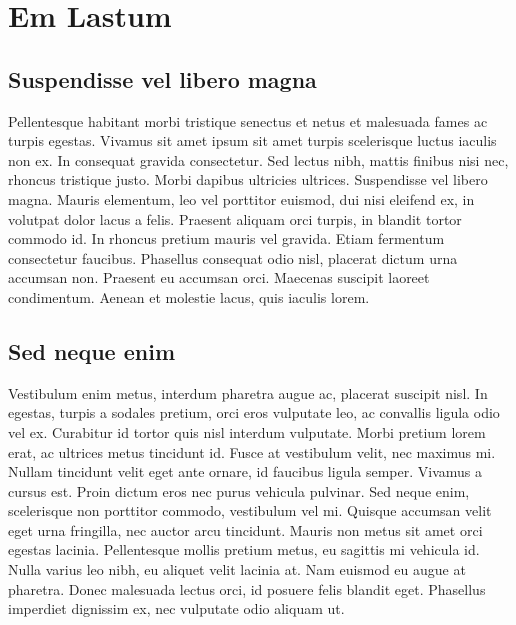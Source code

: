 \chapter{Em Lastum}

\section{Suspendisse vel libero magna}
Pellentesque habitant morbi tristique senectus et netus et malesuada fames ac turpis egestas.
 Vivamus sit amet ipsum sit amet turpis scelerisque luctus iaculis non ex. In consequat 
 gravida consectetur. Sed lectus nibh, mattis finibus nisi nec, rhoncus tristique justo. 
 Morbi dapibus ultricies ultrices. Suspendisse vel libero magna. Mauris elementum, leo 
 vel porttitor euismod, dui nisi eleifend ex, in volutpat dolor lacus a felis. Praesent
 aliquam orci turpis, in blandit tortor commodo id. In rhoncus pretium mauris vel gravida. 
 Etiam fermentum consectetur faucibus. Phasellus consequat odio nisl, placerat dictum urna 
 accumsan non. Praesent eu accumsan orci. Maecenas suscipit laoreet condimentum. Aenean et 
 molestie lacus, quis iaculis lorem.
 
 \section{Sed neque enim}
 Vestibulum enim metus, interdum pharetra augue ac, placerat suscipit nisl. In egestas, 
 turpis a sodales pretium, orci eros vulputate leo, ac convallis ligula odio vel ex. 
 Curabitur id tortor quis nisl interdum vulputate. Morbi pretium lorem erat, ac ultrices
 metus tincidunt id. Fusce at vestibulum velit, nec maximus mi. Nullam tincidunt velit 
 eget ante ornare, id faucibus ligula semper. Vivamus a cursus est. Proin dictum eros nec 
 purus vehicula pulvinar. Sed neque enim, scelerisque non porttitor commodo, vestibulum 
 vel mi. Quisque accumsan velit eget urna fringilla, nec auctor arcu tincidunt. Mauris 
 non metus sit amet orci egestas lacinia. Pellentesque mollis pretium metus, eu sagittis
 mi vehicula id. Nulla varius leo nibh, eu aliquet velit lacinia at. Nam euismod eu augue 
 at pharetra. Donec malesuada lectus orci, id posuere felis blandit eget. Phasellus 
 imperdiet dignissim ex, nec vulputate odio aliquam ut.
